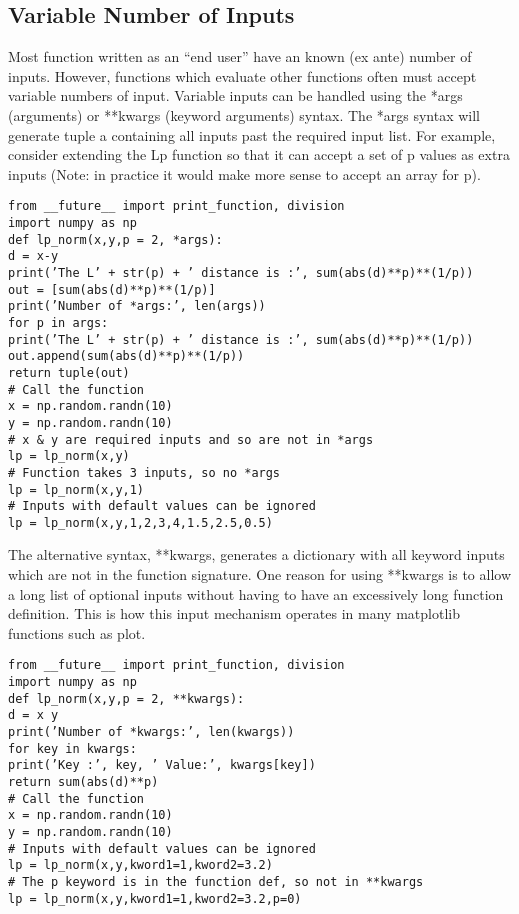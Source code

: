 \documentclass[KSmain.tex]{subfiles}
\begin{document}
\subsection{Variable Number of Inputs}
Most function written as an “end user” have an known (ex ante) number of inputs. However, functions
which evaluate other functions often must accept variable numbers of input. Variable inputs can be handled
using the *args (arguments) or **kwargs (keyword arguments) syntax. The *args syntax will generate
tuple a containing all inputs past the required input list. For example, consider extending the Lp function
so that it can accept a set of p values as extra inputs (Note: in practice it would make more sense to accept
an array for p).
\begin{framed}
\begin{verbatim}
from __future__ import print_function, division
import numpy as np
def lp_norm(x,y,p = 2, *args):
d = x-y
print(’The L’ + str(p) + ’ distance is :’, sum(abs(d)**p)**(1/p))
out = [sum(abs(d)**p)**(1/p)]
print(’Number of *args:’, len(args))
for p in args:
print(’The L’ + str(p) + ’ distance is :’, sum(abs(d)**p)**(1/p))
out.append(sum(abs(d)**p)**(1/p))
return tuple(out)
# Call the function
x = np.random.randn(10)
y = np.random.randn(10)
# x & y are required inputs and so are not in *args
lp = lp_norm(x,y)
# Function takes 3 inputs, so no *args
lp = lp_norm(x,y,1)
# Inputs with default values can be ignored
lp = lp_norm(x,y,1,2,3,4,1.5,2.5,0.5)
\end{verbatim}
\end{framed}
The alternative syntax, **kwargs, generates a dictionary with all keyword inputs which are not in the
function signature. One reason for using **kwargs is to allow a long list of optional inputs without having
to have an excessively long function definition. This is how this input mechanism operates in many
matplotlib functions such as plot.
\begin{framed}
	\begin{verbatim}
from __future__ import print_function, division
import numpy as np
def lp_norm(x,y,p = 2, **kwargs):
d = x y
print(’Number of *kwargs:’, len(kwargs))
for key in kwargs:
print(’Key :’, key, ’ Value:’, kwargs[key])
return sum(abs(d)**p)
# Call the function
x = np.random.randn(10)
y = np.random.randn(10)
# Inputs with default values can be ignored
lp = lp_norm(x,y,kword1=1,kword2=3.2)
# The p keyword is in the function def, so not in **kwargs
lp = lp_norm(x,y,kword1=1,kword2=3.2,p=0)
\end{verbatim}
\end{framed}
\end{document}
